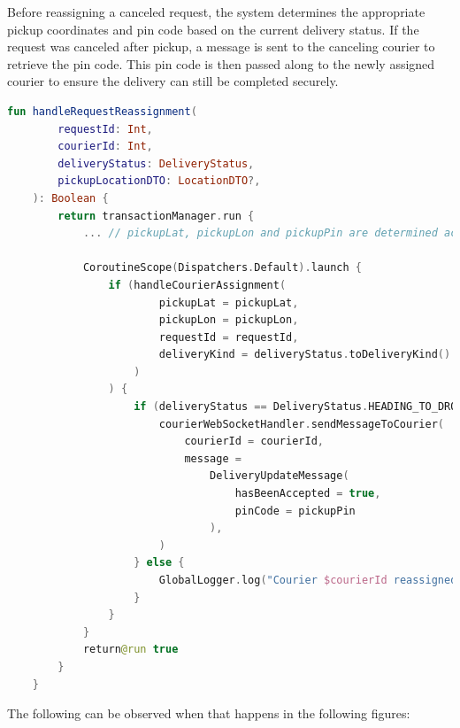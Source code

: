 \newpage

Before reassigning a canceled request, the system determines the appropriate pickup coordinates and pin code based on the current delivery status. If the request was canceled after pickup, a message is sent to the canceling courier to retrieve the pin code. This pin code is then passed along to the newly assigned courier to ensure the delivery can still be completed securely.

\begin{lstlisting}[language=Kotlin, caption={Reassignment of a cancelled request}]
fun handleRequestReassignment(
        requestId: Int,
        courierId: Int,
        deliveryStatus: DeliveryStatus,
        pickupLocationDTO: LocationDTO?,
    ): Boolean {
        return transactionManager.run {
            ... // pickupLat, pickupLon and pickupPin are determined according to the delivery status

            CoroutineScope(Dispatchers.Default).launch {
                if (handleCourierAssignment(
                        pickupLat = pickupLat,
                        pickupLon = pickupLon,
                        requestId = requestId,
                        deliveryKind = deliveryStatus.toDeliveryKind().name,
                    )
                ) {
                    if (deliveryStatus == DeliveryStatus.HEADING_TO_DROPOFF) {
                        courierWebSocketHandler.sendMessageToCourier(
                            courierId = courierId,
                            message =
                                DeliveryUpdateMessage(
                                    hasBeenAccepted = true,
                                    pinCode = pickupPin
                                ),
                        )
                    } else {
                        GlobalLogger.log("Courier $courierId reassigned to request $requestId")
                    }
                }
            }
            return@run true
        }
    }
\end{lstlisting}

\vspace{5mm}

The following can be observed when that happens in the following figures:

